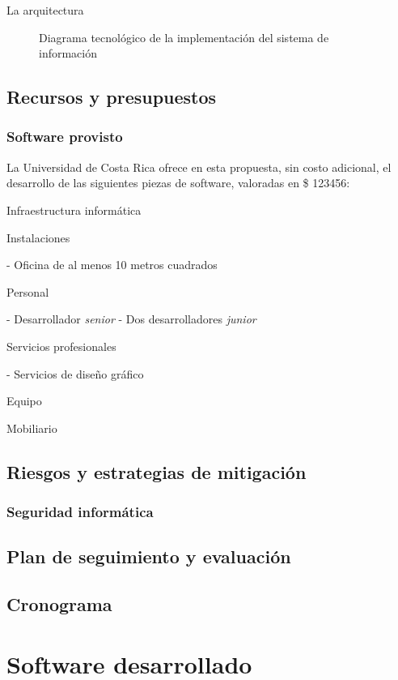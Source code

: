 \documentclass{report}
\begin{document}
La arquitectura 

\begin{figure}
\centering

\caption{Diagrama tecnológico de la implementación del sistema de información}
\label{F:arquitectura}
\end{figure}

\section{Recursos y presupuestos}

\subsection{Software provisto}

La Universidad de Costa Rica ofrece en esta propuesta, sin costo adicional, el desarrollo de las siguientes piezas de software, valoradas en \$ 123456:

Infraestructura informática

Instalaciones

- Oficina de al menos 10 metros cuadrados

Personal

- Desarrollador \textit{senior}
- Dos desarrolladores \textit{junior}

Servicios profesionales

- Servicios de diseño gráfico

Equipo

Mobiliario


\section{Riesgos y estrategias de mitigación}
\label{S:riesgos}

\subsection{Seguridad informática}

\section{Plan de seguimiento y evaluación}

\section{Cronograma}

\appendix

\chapter{Software desarrollado}



\printbibliography
\end{document}
